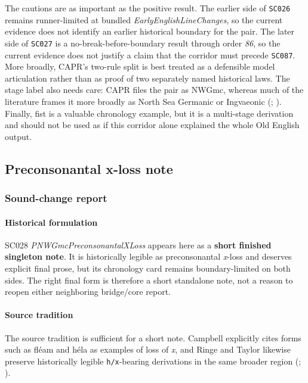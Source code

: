 \documentclass[
  british,
  a4paper,
]{article}
\begin{document}
The cautions are as important as the positive result. The earlier side
of \texttt{SC026} remains runner-limited at bundled
\emph{EarlyEnglishLineChanges}, so the current evidence does not
identify an earlier historical boundary for the pair. The later side of
\texttt{SC027} is a no-break-before-boundary result through order
\emph{86}, so the current evidence does not justify a claim that the
corridor must precede \texttt{SC087}. More broadly, CAPR's two-rule
split is best treated as a defensible model articulation rather than as
proof of two separately named historical laws. The stage label also
needs care: CAPR files the pair as NWGmc, whereas much of the literature
frames it more broadly as North Sea Germanic or Ingvaeonic
(;
). Finally, fist is a
valuable chronology example, but it is a multi-stage derivation and
should not be used as if this corridor alone explained the whole Old
English output.

\subsection{Preconsonantal x-loss
note}\label{preconsonantal-x-loss-note}

\subsubsection{Sound-change report}\label{sound-change-report-20}

\paragraph{Historical formulation}\label{historical-formulation-20}

SC028 \emph{PNWGmcPreconsonantalXLoss} appears here as a \textbf{short
finished singleton note}. It is historically legible as preconsonantal
\emph{x}-loss and deserves explicit final prose, but its chronology card
remains boundary-limited on both sides. The right final form is
therefore a short standalone note, not a reason to reopen either
neighboring bridge/core report.

\paragraph{Source tradition}\label{source-tradition-20}

The source tradition is sufficient for a short note. Campbell explicitly
cites forms such as fléam and héla as examples of loss of \emph{x}, and
Ringe and Taylor likewise preserve historically legible
\texttt{h/x}-bearing derivations in the same broader region
(;
).
\end{document}
